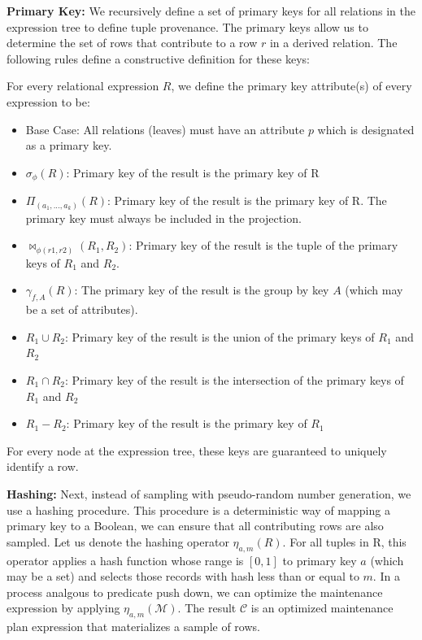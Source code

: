 \noindent\textbf{Primary Key: }We recursively define a set of primary keys for all relations in the expression tree to define tuple provenance.
The primary keys allow us to determine the set of rows that contribute to a row $r$ in a derived relation.
The following rules define a constructive definition for these keys: 
\begin{definition} \label{pk}
For every relational expression $R$, we define the primary key attribute(s) of every expression to be:
\begin{itemize}[noitemsep]
\item Base Case: All relations (leaves) must have an attribute $p$ which is designated as a primary key. 
\item $\sigma_{\phi}(R)$: Primary key of the result is the primary key of R 
\item $\Pi_{(a_1,...,a_k)}(R)$: Primary key of the result is the primary key of R. The primary key must always be included in the projection.
\item $\bowtie_{\phi (r1,r2)}(R_1,R_2)$: Primary key of the result is the tuple of the primary keys of $R_1$ and $R_2$. 
\item $\gamma_{f,A}(R)$: The primary key of the result is the group by key $A$ (which may be a set of attributes).
\item $R_1 \cup R_2$: Primary key of the result is the union of the primary keys of $R_1$ and $R_2$
\item $R_1 \cap R_2$: Primary key of the result is the intersection of the primary keys of $R_1$ and $R_2$
\item $R_1 - R_2$: Primary key of the result is the primary key of $R_1$
\end{itemize}
For every node at the expression tree, these keys are guaranteed to uniquely identify a row.
\end{definition}

\noindent\textbf{Hashing: } Next, instead of sampling with pseudo-random number generation, we use a hashing procedure.
This procedure is a deterministic way of mapping a primary key to a Boolean, we can ensure that all contributing rows are also sampled. 
Let us denote the hashing operator $\eta_{a, m}(R)$. 
For all tuples in R, this operator applies a hash function whose range is $[0,1]$ to primary key $a$ (which may be a set) and selects those records with hash less than or equal to $m$.
In a process analgous to predicate push down, we can optimize the maintenance expression by applying $\eta_{a, m}(\mathcal{M})$.
The result $\mathcal{C}$ is an optimized maintenance plan expression that materializes a sample of rows.

